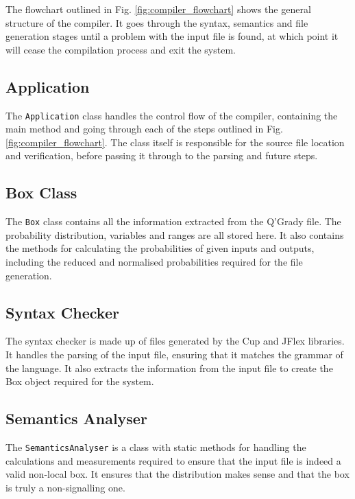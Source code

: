 \documentclass[report.tex]{subfiles}
\begin{document}
The flowchart outlined in Fig. \ref{fig:compiler_flowchart} shows the general
structure of the compiler. It goes through the syntax, semantics and file
generation stages until a problem with the input file is found, at which point
it will cease the compilation process and exit the system.

\subsection{Application} %
\label{sub:application}
The \texttt{Application} class handles the control flow of the compiler,
containing the main method and going through each of the steps outlined in Fig.
\ref{fig:compiler_flowchart}. The class itself is responsible for the source
file location and verification, before passing it through to the parsing and
future steps.

\subsection{Box Class} %
\label{sub:box_class}
The \texttt{Box} class contains all the information extracted from the Q'Grady
file. The probability distribution, variables and ranges are all stored here. It
also contains the methods for calculating the probabilities of given inputs and
outputs, including the reduced and normalised probabilities required for the
file generation.

\subsection{Syntax Checker} %
\label{sub:syntax_checker}
The syntax checker is made up of files generated by the Cup and JFlex libraries.
It handles the parsing of the input file, ensuring that it matches the grammar
of the language. It also extracts the information from the input file to create
the Box object required for the system.

\subsection{Semantics Analyser} %
\label{sub:semantics_analyser}
The \texttt{SemanticsAnalyser} is a class with static methods for handling the
calculations and measurements required to ensure that the input file is indeed a
valid non-local box. It ensures that the distribution makes sense and that the
box is truly a non-signalling one.
\end{document}
